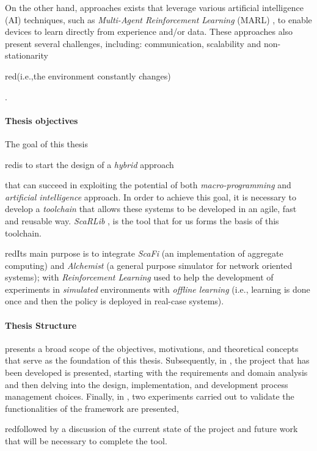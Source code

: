 \documentclass[12pt,a4paper,openright,twoside]{book}
\begin{document}
On the other hand, approaches exists that leverage various artificial intelligence (AI) techniques, 
    such as \emph{Multi-Agent Reinforcement Learning} (MARL) \cite{busoniu2008comprehensive, marlsurvey},
    to enable devices to learn directly from experience and/or data. These approaches also present several challenges, including: 
    communication, scalability and non-stationarity 
    \begin{color}{red}(i.e.,the environment constantly changes)\end{color} \cite{hernandez2017survey}.

%
\paragraph{Thesis objectives}
The goal of this thesis \begin{color}{red}is to start the design of a \emph{hybrid} approach \end{color}
    that can succeed in exploiting the potential of both \emph{macro-programming} and \emph{artificial intelligence} approach.
    In order to achieve this goal, it is necessary to develop a \emph{toolchain} that allows these systems to be developed in an agile,
    fast and reusable way. 
    \emph{ScaRLib} \cite{scarlib}, is the tool that for us forms the basis of this toolchain.
    \begin{color}{red}Its main purpose is to integrate \emph{ScaFi} \cite{casadei2022scafi} (an implementation of aggregate computing) 
    and \emph{Alchemist} \cite{pianini2013chemical} (a general purpose simulator for network oriented systems); 
    with \emph{Reinforcement Learning} used to help the development of experiments in \emph{simulated} environments with \emph{offline learning}
    (i.e., learning is done once and then the policy is deployed in real-case systems). \end{color}

%
\paragraph{Thesis Structure} 

 presents a broad scope of the objectives, motivations, and theoretical concepts that serve as the foundation 
    of this thesis. Subsequently, in , the project that has been developed is presented, starting with 
    the requirements and domain analysis and then delving into the design, implementation, and development process management choices. 
    Finally, in , two experiments carried out to validate the functionalities of the framework are presented,
    \begin{color}{red}followed by a discussion of the current state of the project and future work that will be necessary to complete the tool. \end{color}
\end{document}
